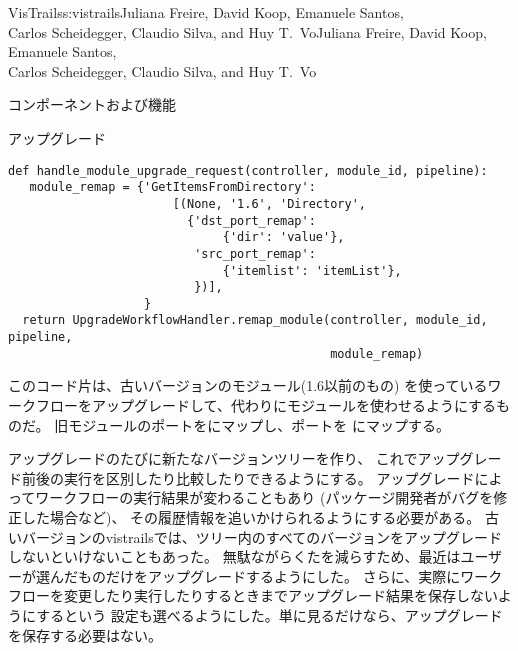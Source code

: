 \begin{aosachaptertoc}{VisTrails}{s:vistrails}{Juliana Freire, David Koop, Emanuele Santos, \\ Carlos Scheidegger, Claudio Silva, and Huy T.\ Vo}{Juliana Freire, David Koop, Emanuele Santos, \\ \hspace*{0.9cm} Carlos Scheidegger, Claudio Silva, and Huy T.\ Vo}
\begin{aosasect1}{コンポーネントおよび機能}
\begin{aosasect2}{アップグレード}
\begin{verbatim}
def handle_module_upgrade_request(controller, module_id, pipeline):
   module_remap = {'GetItemsFromDirectory':
                       [(None, '1.6', 'Directory',
                         {'dst_port_remap':
                              {'dir': 'value'},
                          'src_port_remap':
                              {'itemlist': 'itemList'},
                          })],
                   }
  return UpgradeWorkflowHandler.remap_module(controller, module_id, pipeline,
                                             module_remap)
\end{verbatim}

このコード片は、古いバージョンのモジュール(1.6以前のもの)
を使っているワークフローをアップグレードして、代わりにモジュールを使わせるようにするものだ。
旧モジュールのポートをにマップし、ポートを
にマップする。

アップグレードのたびに新たなバージョンツリーを作り、
これでアップグレード前後の実行を区別したり比較したりできるようにする。
アップグレードによってワークフローの実行結果が変わることもあり
(パッケージ開発者がバグを修正した場合など)、
その履歴情報を追いかけられるようにする必要がある。
古いバージョンのvistrailsでは、ツリー内のすべてのバージョンをアップグレードしないといけないこともあった。
無駄ながらくたを減らすため、最近はユーザーが選んだものだけをアップグレードするようにした。
さらに、実際にワークフローを変更したり実行したりするときまでアップグレード結果を保存しないようにするという
設定も選べるようにした。単に見るだけなら、アップグレードを保存する必要はない。


\end{aosasect2}
\end{aosasect1}
\end{aosachaptertoc}

